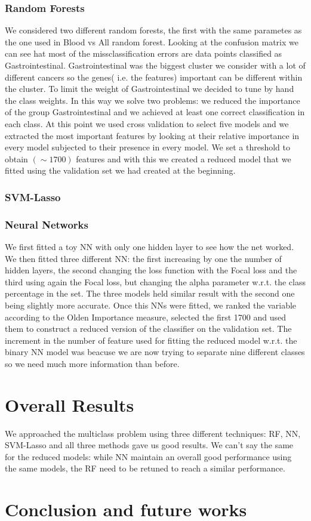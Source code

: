 \documentclass[a4paper,11pt, oneside]{article}  %
\begin{document}
\subsubsection{Random Forests}
We considered two different random forests, the first with the same parametes as the one used in Blood vs All random forest. Looking at the confusion matrix we can see hat most of the missclassification errors are data points classified as Gastrointestinal. Gastrointestinal was the biggest cluster we consider with a lot of different cancers so the genes( i.e. the features) important can be different within the cluster. To limit the weight of Gastrointestinal we decided to tune by hand the class weights. In this way we solve two problems: we reduced the importance of the group Gastrointestinal and we achieved at least one correct classification in each class. At this point we used cross validation to select five models and we extracted the most important features by looking at their relative importance in every model subjected to their presence in every model. We set a threshold to obtain  $(\sim   1700)$ features and with this we created a reduced model that we fitted using the validation set we had created at the beginning.
\subsubsection{SVM-Lasso}

\subsubsection{Neural Networks}
We first fitted a toy NN with only one hidden layer to see how the net worked.
We then fitted three different NN: the first increasing by one the number of hidden layers, the second changing the loss function with the Focal loss and the third using again the Focal loss, but changing the alpha parameter w.r.t. the class percentage in the set.
The three models held similar result with the second one being slightly more accurate. Once this NNs were fitted, we ranked the variable according to the Olden Importance measure, selected the first 1700 and used them to construct a reduced version of the classifier on the validation set.
The increment in the number of feature used for fitting the reduced model w.r.t. the binary NN model was beacuse we are now trying to separate nine different classes so we need much more information than before.

\section{Overall Results}
We approached the multiclass problem using three different techniques: RF, NN, SVM-Lasso and all three methods gave us good results. We can't say the same for the reduced models: while NN maintain an overall good performance using the same models, the RF need to be retuned to reach a similar performance. 


\section{Conclusion and future works}


\end{document}
